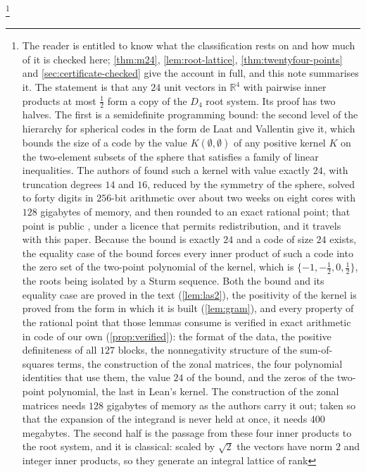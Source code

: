 \documentclass[11pt,reqno]{amsart}
\renewcommand{\_}{\origunderscore\allowbreak}
\numberwithin{equation}{section}
\theoremstyle{plain}
\theoremstyle{definition}
\theoremstyle{remark}
\begin{document}
\footnote{The reader is entitled to know what the classification rests
  on and how much of it is checked here; \cref{thm:m24},
  \cref{lem:root-lattice}, \cref{thm:twentyfour-points} and
  \cref{sec:certificate-checked} give the account in full, and this note
  summarises it. The statement is that any $24$ unit vectors in
  $\mathbb{R}^4$ with pairwise inner products at most $\tfrac12$ form a
  copy of the $D_4$ root system. Its proof has two halves. The first is
  a semidefinite programming bound: the second level of the hierarchy
  for spherical codes in the form de Laat and Vallentin \cite{dLV15}
  give it, which bounds the size of a code by the value
  $K(\emptyset,\emptyset)$ of any positive kernel $K$ on the
  two-element subsets of the sphere that satisfies a family of linear
  inequalities. The authors of \cite{LLM24} found such a kernel with
  value exactly $24$, with truncation degrees $14$ and $16$, reduced by
  the symmetry of the sphere, solved to forty digits in $256$-bit
  arithmetic over about two weeks on eight cores with $128$ gigabytes
  of memory, and then rounded to an exact rational point; that point is
  public \cite{LLM24data}, under a licence that permits redistribution,
  and it travels with this paper. Because the bound is exactly $24$ and
  a code of size $24$ exists, the equality case of the bound forces
  every inner product of such a code into the zero set of the two-point
  polynomial of the kernel, which is $\{-1,-\tfrac12,0,\tfrac12\}$, the
  roots being isolated by a Sturm sequence. Both the bound and its
  equality case are proved in the text (\cref{lem:las2}), the positivity
  of the kernel is proved from the form in which it is built
  (\cref{lem:gram}), and every property of the rational point that
  those lemmas consume is verified in exact arithmetic in code of our
  own (\cref{prop:verified}): the format of the data, the positive
  definiteness of all $127$ blocks, the nonnegativity structure of the
  sum-of-squares terms, the construction of the zonal matrices, the four
  polynomial identities that use them, the value $24$ of the bound, and
  the zeros of the two-point polynomial, the last in Lean's kernel. The
  construction of the zonal matrices needs $128$ gigabytes of memory as
  the authors carry it out; taken so that the expansion of the integrand
  is never held at once, it needs $400$ megabytes. The second half is
  the passage from these four inner products to the root system, and it
  is classical: scaled by $\sqrt2$ the vectors have norm $2$ and
  integer inner products, so they generate an integral lattice of rank
}
\end{document}
